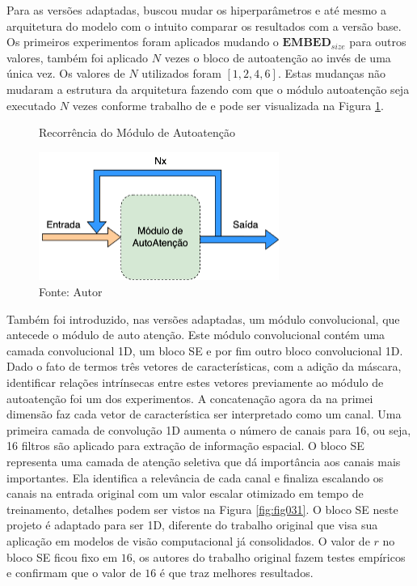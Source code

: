 Para as versões adaptadas, buscou mudar os hiperparâmetros e até mesmo a arquitetura do modelo com o intuito comparar os resultados com a versão base. Os primeiros experimentos foram aplicados mudando o $\textbf{EMBED}_{size}$ para outros valores, também foi aplicado $N$ vezes o bloco de autoatenção ao invés de uma única vez. Os valores de $N$ utilizados foram $[1, 2, 4, 6]$. Estas mudanças não mudaram a estrutura da arquitetura fazendo com que o módulo autoatenção seja executado $N$ vezes conforme trabalho de \cite{vaswaniAttentionAllYou2023} e pode ser visualizada na Figura \ref{fig:fig030}.

\begin{figure}[h!]
    \centering
    \caption{Recorrência do Módulo de Autoatenção}
    \includegraphics[width=0.7\textwidth]{figures/fig030.png}
    \caption*{Fonte: Autor}
    \label{fig:fig030}
\end{figure}

Também foi introduzido, nas versões adaptadas, um módulo convolucional, que antecede o módulo de auto atenção. Este módulo convolucional contém uma camada convolucional 1D, um bloco \gls{SE} e por fim outro bloco convolucional 1D. Dado o fato de termos três vetores de características, com a adição da máscara, identificar relações intrínsecas entre estes vetores previamente ao módulo de autoatenção foi um dos experimentos. A concatenação agora da na primei dimensão faz cada vetor de característica ser interpretado como um canal. Uma primeira camada de convolução 1D aumenta o número de canais para 16, ou seja, 16 filtros são aplicado para extração de informação espacial. O bloco \gls{SE} representa uma camada de atenção seletiva que dá importância aos canais mais importantes. Ela identifica a relevância de cada canal e finaliza escalando os canais na entrada original com um valor escalar otimizado em tempo de treinamento, detalhes podem ser vistos na Figura \ref{fig:fig031}. O bloco \gls{SE} neste projeto é adaptado para ser 1D, diferente do trabalho original que visa sua aplicação em modelos de visão computacional já consolidados. O valor de $r$ no bloco \gls{SE} ficou fixo em $16$, os autores do trabalho original fazem testes empíricos e confirmam que o valor de $16$ é que traz melhores resultados.

